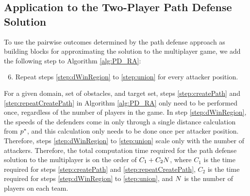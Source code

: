 \subsection{Application to the Two-Player Path Defense Solution}
\label{subsec:MMPD}
To use the pairwise outcomes determined by the path defense approach as building blocks for approximating the solution to the multiplayer game, we add the following step to Algorithm \ref{alg:PD_RA}: 
\begin{enumerate}
\setcounter{enumi}{5}
\item Repeat steps \ref{step:dWinRegion} to \ref{step:union} for every attacker position.
\end{enumerate}

For a given domain, set of obstacles, and target set, steps \ref{step:createPath} and \ref{step:repeatCreatePath} in Algorithm \ref{alg:PD_RA} only need to be performed once, regardless of the number of players in the game. In step \ref{step:dWinRegion}, the speeds of the defenders come in only through a single distance calculation from $p^*$, and this calculation only needs to be done once per attacker position. Therefore, steps \ref{step:dWinRegion} to \ref{step:union} scale only with the number of attackers. Therefore, the total computation time required for the path defense solution to the multiplayer is on the order of $C_1 + C_2 N$, where $C_1$ is the time required for steps \ref{step:createPath} and \ref{step:repeatCreatePath}, $C_2$ is the time required for steps \ref{step:dWinRegion} to \ref{step:union}, and $N$ is the number of players on each team. 
